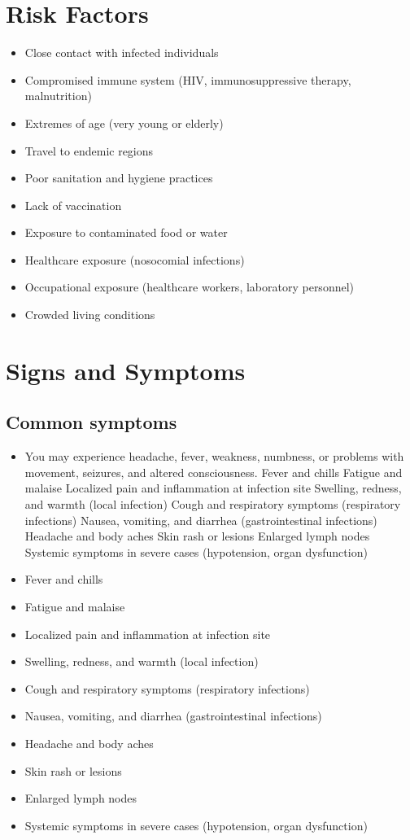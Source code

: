 \section{Risk Factors}

\begin{itemize}[noitemsep]
  \item Close contact with infected individuals
  \item Compromised immune system (HIV, immunosuppressive therapy, malnutrition)
  \item Extremes of age (very young or elderly)
  \item Travel to endemic regions
  \item Poor sanitation and hygiene practices
  \item Lack of vaccination
  \item Exposure to contaminated food or water
  \item Healthcare exposure (nosocomial infections)
  \item Occupational exposure (healthcare workers, laboratory personnel)
  \item Crowded living conditions
\end{itemize}
\section{Signs and Symptoms}

\subsection{Common symptoms}
\begin{itemize}[noitemsep]
  \item You may experience headache, fever, weakness, numbness, or problems with movement, seizures, and altered consciousness. Fever and chills Fatigue and malaise Localized pain and inflammation at infection site Swelling, redness, and warmth (local infection) Cough and respiratory symptoms (respiratory infections) Nausea, vomiting, and diarrhea (gastrointestinal infections) Headache and body aches Skin rash or lesions Enlarged lymph nodes Systemic symptoms in severe cases (hypotension, organ dysfunction)
  \item Fever and chills
  \item Fatigue and malaise
  \item Localized pain and inflammation at infection site
  \item Swelling, redness, and warmth (local infection)
  \item Cough and respiratory symptoms (respiratory infections)
  \item Nausea, vomiting, and diarrhea (gastrointestinal infections)
  \item Headache and body aches
  \item Skin rash or lesions
  \item Enlarged lymph nodes
  \item Systemic symptoms in severe cases (hypotension, organ dysfunction)
\end{itemize}


